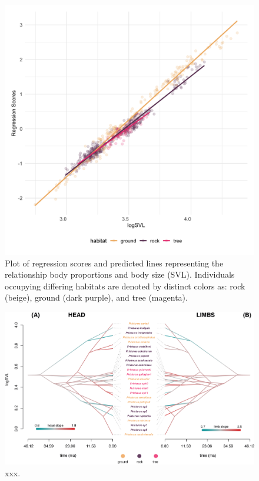 \documentclass[
]{article}
\begin{document}
\begin{figure}[H]
\includegraphics[width=1\linewidth]{Figs/figure_2_ggplot} \caption{Plot of regression scores and predicted lines representing the relationship body proportions and body size (SVL). Individuals occupying differing habitats are denoted by distinct colors as: rock (beige), ground (dark purple), and tree (magenta).}\label{fig:unnamed-chunk-2}
\end{figure}

\newpage

\begin{figure}
\includegraphics[width=1\linewidth]{Figs/figure_phenograms} \caption{xxx.}\label{fig:unnamed-chunk-3}
\end{figure}
\end{document}
